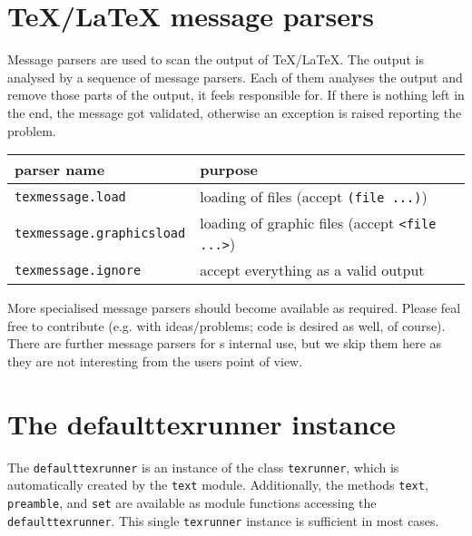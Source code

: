 \section{\TeX/\LaTeX{} message parsers}

Message parsers are used to scan the output of \TeX/\LaTeX. The output
is analysed by a sequence of message parsers. Each of them analyses
the output and remove those parts of the output, it feels responsible
for. If there is nothing left in the end, the message got validated,
otherwise an exception is raised reporting the problem.

\medskip
\begin{tabular}{ll}
parser name&purpose\\
\hline
\texttt{texmessage.load}&loading of files (accept \texttt{(file ...)})\\
\texttt{texmessage.graphicsload}&loading of graphic files (accept \texttt{<file ...>})\\
\texttt{texmessage.ignore}&accept everything as a valid output\\
\end{tabular}
\medskip

More specialised message parsers should become available as required.
Please feal free to contribute (e.g. with ideas/problems; code is
desired as well, of course). There are further message parsers for
\PyX{}s internal use, but we skip them here as they are not
interesting from the users point of view.

\section{The defaulttexrunner instance}
The \verb|defaulttexrunner| is an instance of the class
\verb|texrunner|, which is automatically created by the \verb|text|
module. Additionally, the methods \verb|text|, \verb|preamble|, and
\verb|set| are available as module functions accessing the
\verb|defaulttexrunner|. This single \verb|texrunner| instance is
sufficient in most cases.

